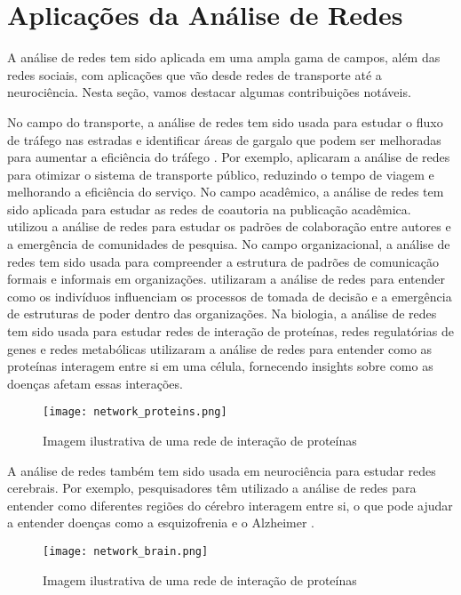 \section{Aplicações da Análise de Redes}

A análise de redes tem sido aplicada em uma ampla gama de campos, além das redes sociais, com aplicações que vão desde redes de transporte até a neurociência. Nesta seção, vamos destacar algumas contribuições notáveis.

No campo do transporte, a análise de redes tem sido usada para estudar o fluxo de tráfego nas estradas e identificar áreas de gargalo que podem ser melhoradas para aumentar a eficiência do tráfego \cite[]{2012_Levinson}. Por exemplo,  aplicaram a análise de redes para otimizar o sistema de transporte público, reduzindo o tempo de viagem e melhorando a eficiência do serviço. No campo acadêmico, a análise de redes tem sido aplicada para estudar as redes de coautoria na publicação acadêmica.  utilizou a análise de redes para estudar os padrões de colaboração entre autores e a emergência de comunidades de pesquisa. No campo organizacional, a análise de redes tem sido usada para compreender a estrutura de padrões de comunicação formais e informais em organizações.  utilizaram a análise de redes para entender como os indivíduos influenciam os processos de tomada de decisão e a emergência de estruturas de poder dentro das organizações. Na biologia, a análise de redes tem sido usada para estudar redes de interação de proteínas, redes regulatórias de genes e redes metabólicas  utilizaram a análise de redes para entender como as proteínas interagem entre si em uma célula, fornecendo insights sobre como as doenças afetam essas interações.
\begin{figure}[!htb]
	\caption{Imagem ilustrativa de uma rede de interação de proteínas}
	\label{fig:network_proteins}
	\centering
	\texttt{[image: network\_proteins.png]}
\end{figure}
A análise de redes também tem sido usada em neurociência para estudar redes cerebrais. Por exemplo, pesquisadores têm utilizado a análise de redes para entender como diferentes regiões do cérebro interagem entre si, o que pode ajudar a entender doenças como a esquizofrenia e o Alzheimer \cite[]{2009_Bullmore}.
\begin{figure}[!htb]
	\caption{Imagem ilustrativa de uma rede de interação de proteínas}
	\label{fig:network_brain}
	\centering
	\texttt{[image: network\_brain.png]}
\end{figure}

